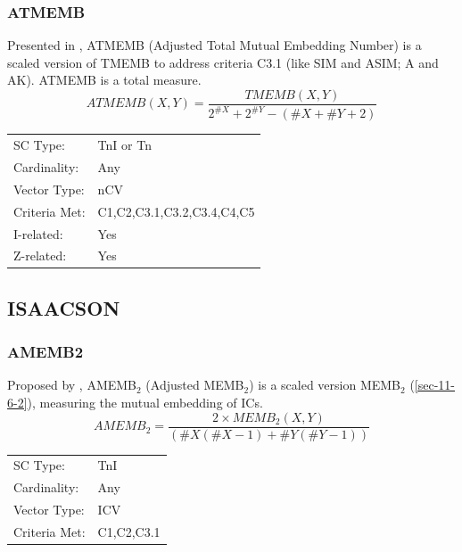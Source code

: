 \documentclass{article}
\begin{document}
\subsubsection{ATMEMB}
\label{sec-11-6-4}

Presented in \citet[pp. 494]{Rahn1979}, ATMEMB (Adjusted Total Mutual
Embedding Number) is a scaled version of TMEMB to address criteria
C3.1 (like SIM and ASIM; A and AK). ATMEMB is a total measure.
$$ATMEMB\left(X,Y\right)=\frac{TMEMB\left(X,Y\right)}{2^{\#X}+2^{\#Y}-\left(\#X+\#Y+2\right)}$$

\begin{center}
\begin{tabular}{ll}
 SC Type:       &  TnI or Tn                   \\
 Cardinality:   &  Any                         \\
 Vector Type:   &  nCV                         \\
 Criteria Met:  &  C1,C2,C3.1,C3.2,C3.4,C4,C5  \\
 I-related:     &  Yes                         \\
 Z-related:     &  Yes                         \\
\end{tabular}
\end{center}
\subsection{ISAACSON}
\label{sec-11-7}
\subsubsection{AMEMB2}
\label{sec-11-7-1}

Proposed by \citet[pp. 8]{Isaacson1990}, AMEMB$_{2}$ (Adjusted MEMB$_{2}$)
is a scaled version MEMB$_{2}$ (\ref{sec-11-6-2}), measuring the mutual
embedding of ICs.  $$AMEMB_{2}=\frac{2 \times
MEMB_{2}(X,Y)}{\left(\#X\left(\#X-1\right)+\#Y\left(\#Y-1\right)\right)}$$

\begin{center}
\begin{tabular}{ll}
 SC Type:       &  TnI         \\
 Cardinality:   &  Any         \\
 Vector Type:   &  ICV         \\
 Criteria Met:  &  C1,C2,C3.1  \\
\end{tabular}
\end{center}
\end{document}

